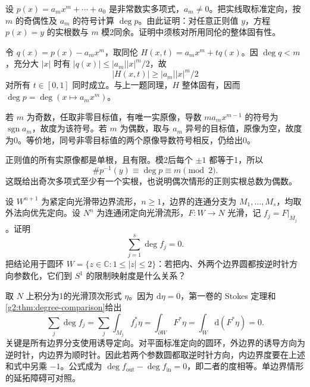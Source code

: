 \begin{exercise}\label{g2:ex:real-polynomial-degree}
	设 \(p(x)=a_mx^m+\cdots+a_0\) 是非常数实多项式，\(a_m\ne0\)。把实线取标准定向，按 \(m\) 的奇偶性及 \(a_m\) 的符号计算 \(\deg p\)。由此证明：对任意正则值 \(y\)，方程 \(p(x)=y\) 的实根数与 \(m\) 模2同余。证明中须核对所用同伦的整体固有性。
\end{exercise}
\begin{solution}
	令 \(q(x)=p(x)-a_mx^m\)，取同伦 \(H(x,t)=a_mx^m+tq(x)\)。因 \(\deg q<m\)，充分大 \(|x|\) 时有 \(|q(x)|\le|a_m||x|^m/2\)，故
	\[
		|H(x,t)|\ge |a_m||x|^m/2
	\]
	对所有 \(t\in[0,1]\) 同时成立。与上一题同理，\(H\) 整体固有，因而 \(\deg p=\deg(x\mapsto a_mx^m)\)。

	若 \(m\) 为奇数，任取非零目标值，有唯一实原像，导数 \(ma_mx^{m-1}\) 的符号为 \(\operatorname{sgn}a_m\)，故度为该符号。若 \(m\) 为偶数，取与 \(a_m\) 异号的目标值，原像为空，故度为0。等价地，同号非零目标值的两个原像导数符号相反，仍给出0。

	正则值的所有实原像都是单根，且有限。模2后每个 \(\pm1\) 都等于1，所以
	\[
		\#p^{-1}(y)\equiv\deg p\equiv m\pmod2.
	\]
	这既给出奇次多项式至少有一个实根，也说明偶次情形的正则实根总数为偶数。
\end{solution}

\begin{exercise}\label{g2:ex:boundary-degree-balance}
	设 \(W^{n+1}\) 为紧定向光滑带边界流形，\(n\ge1\)，边界的连通分支为 \(M_1,\ldots,M_s\)，均取外法向优先定向。设 \(N^n\) 为连通闭定向光滑流形，\(F:W\to N\) 光滑，记 \(f_j=F|_{M_j}\)。证明
	\[
		\sum_{j=1}^s\deg f_j=0.
	\]
	把结论用于圆环 \(W=\{z\in\mathbb C:1\le|z|\le2\}\)：若把内、外两个边界圆都按逆时针方向参数化，它们到 \(S^1\) 的限制映射度是什么关系？
\end{exercise}
\begin{solution}
	取 \(N\) 上积分为1的光滑顶次形式 \(\eta\)。因为 \(\mathrm{d}\eta=0\)，第一卷的 Stokes 定理和\cref{g2:thm:degree-comparison}给出
	\[
		\sum_j\deg f_j
		=\sum_j\int_{M_j}f_j^*\eta
		=\int_{\partial W}F^*\eta
		=\int_W\mathrm{d}(F^*\eta)=0.
	\]
	关键是所有边界分支使用诱导定向。对平面标准定向的圆环，外边界的诱导方向为逆时针，内边界为顺时针。因此若两个参数圆都取逆时针方向，内边界度要在上述和式中另乘 \(-1\)。公式成为 \(\deg f_{\mathrm{out}}-\deg f_{\mathrm{in}}=0\)，即二者的度相等。单边界情形的延拓障碍可对照\cite[第459页，定理17.38]{Lee2012Smooth}。
\end{solution}


